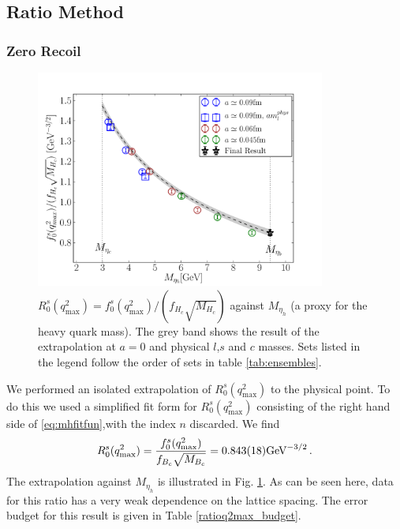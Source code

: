 \subsection{Ratio Method}
\label{sec:ratiomethod}

\subsubsection{Zero Recoil}

\begin{figure}[htb!]
  \begin{center}
  \hspace{-10pt}
  \includegraphics[width=0.85\textwidth]{images/BsDs/ratio/f0fHc_vsmh.pdf}
  \caption{ $R_0^s(q^2_{\text{max}}) = f_0^s(q^2_{\text{max}})/(f_{H_c}\sqrt{M_{H_c}})$ against $M_{\eta_h}$ (a proxy for the heavy quark mass). The grey band shows the result of the extrapolation at $a=0$ and physical $l$,$s$ and $c$ masses. Sets listed in the legend follow the order of sets in table \ref{tab:ensembles}. \label{fig:ratioq2max}}
    \end{center}
\end{figure}

We performed an isolated extrapolation of $R^s_0(q^2_{\text{max}})$ to the physical point. To do this we used a simplified fit form for $R^s_0(q^2_{\text{max}})$ consisting of the right hand side of \eqref{eq:mhfitfun},with the index $n$ discarded.
We find
\begin{align}
  R_0^s(q^2_{\text{max}}) = {f_0^s(q^2_{\text{max}})\over f_{B_c}\sqrt{M_{B_c}}} = 0.843(18) \text{GeV}^{-3/2}\,.
\end{align}
The extrapolation against $M_{\eta_h}$ is illustrated in Fig. \ref{fig:ratioq2max}. As can be seen here, data for this ratio has a very weak dependence on the lattice spacing. The error budget for this result is given in Table \ref{ratioq2max_budget}.

